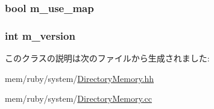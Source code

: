 \label{classDirectoryMemory_a89d33b2d42ea8a07fdd28251d8c88ecc}
\hypertarget{classDirectoryMemory_a3729647a2abfdccf300a0b573c20f7c9}{
\subsubsection[{m\_\-use\_\-map}]{\setlength{\rightskip}{0pt plus 5cm}bool {\bf m\_\-use\_\-map}}}
\label{classDirectoryMemory_a3729647a2abfdccf300a0b573c20f7c9}
\hypertarget{classDirectoryMemory_aae89efc34a31c6494fec8420499645d2}{
\subsubsection[{m\_\-version}]{\setlength{\rightskip}{0pt plus 5cm}int {\bf m\_\-version}}}
\label{classDirectoryMemory_aae89efc34a31c6494fec8420499645d2}


このクラスの説明は次のファイルから生成されました:\begin{DoxyCompactItemize}
\item 
mem/ruby/system/\hyperlink{DirectoryMemory_8hh}{DirectoryMemory.hh}\item 
mem/ruby/system/\hyperlink{DirectoryMemory_8cc}{DirectoryMemory.cc}\end{DoxyCompactItemize}
